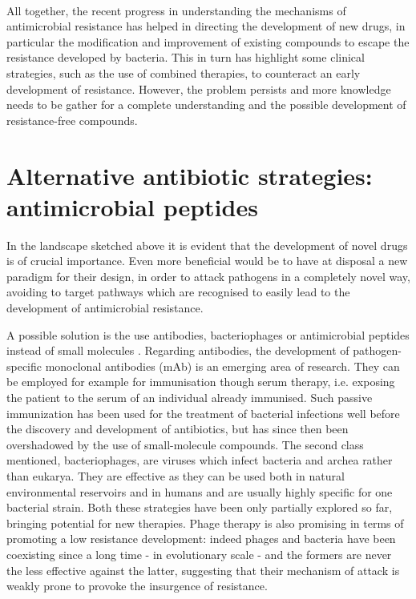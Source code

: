 \hspace{0.5cm}
\\
All together, the recent progress in understanding the mechanisms of antimicrobial resistance has helped in directing the development of new drugs, in particular the modification and improvement of existing compounds to escape the resistance developed by bacteria. This in turn has highlight some clinical strategies, such as the use of combined therapies, to counteract an early development of resistance. However, the problem persists and more knowledge needs to be gather for a complete understanding and the possible development of resistance-free compounds.


\section{Alternative antibiotic strategies: antimicrobial peptides}

%

In the landscape sketched above it is evident that the development of novel drugs is of crucial importance. Even more beneficial would be to have at disposal a new paradigm for their design, in order to attack pathogens in a completely novel way, avoiding to target pathways which are recognised to easily lead to the development of antimicrobial resistance.

A possible solution is the use antibodies, bacteriophages or antimicrobial peptides instead of small molecules \cite{Mantravadi2019}.
%
Regarding antibodies, the development of pathogen-specific monoclonal antibodies (mAb) is an emerging area of research. They can be employed for example for immunisation though serum therapy, i.e. exposing the patient to the serum of an individual already immunised. Such passive immunization has been used for the treatment of bacterial infections well before the discovery and development of antibiotics, but has since then been overshadowed by the use of small-molecule compounds.
%
The second class mentioned, bacteriophages, are viruses which infect bacteria and archea rather than eukarya. They are effective as they can be used both in natural environmental reservoirs and in humans and are usually highly specific for one bacterial strain.
%
Both these strategies have been only partially explored so far, bringing potential for new therapies. Phage therapy is also promising in terms of promoting a low resistance development: indeed phages and bacteria have been coexisting since a long time - in evolutionary scale - and the formers are never the less effective against the latter, suggesting that their mechanism of attack is weakly prone to provoke the insurgence of resistance.

